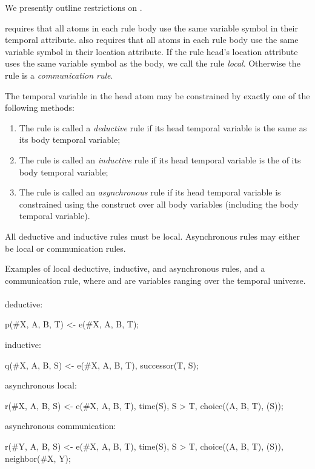 We presently outline restrictions on \lang.

\vspace{1em}
\lang requires that all atoms in each rule body use the same variable symbol in their temporal attribute.  \lang also requires that all atoms in each rule body use the same variable symbol in their location attribute.  If the rule head's location attribute uses the same variable symbol as the body, we call the rule {\em local}.  Otherwise the rule is a {\em communication rule}.

The temporal variable in the head atom may be constrained by exactly one of the following methods:

\begin{enumerate}
\item The rule is called a {\em deductive} rule if its head temporal variable is the same as its body temporal variable;
\item The rule is called an {\em inductive} rule if its head temporal variable is the  of its body temporal variable;
\item The rule is called an {\em asynchronous} rule if its head temporal variable is constrained using the  construct over all body variables (including the body temporal variable).
\end{enumerate}

All deductive and inductive rules must be local.  Asynchronous rules may either be local or communication rules.

\begin{example}
\label{ex:nonsugared}
Examples of local deductive, inductive, and asynchronous rules, and a communication rule, where  and  are variables ranging over the temporal universe.
\\\\
deductive:\\
\begin{Dedalus}
p(#X, A, B, T) <- e(#X, A, B, T);
\end{Dedalus}
inductive:\\
\begin{Dedalus}
q(#X, A, B, S) <- e(#X, A, B, T), successor(T, S);
\end{Dedalus}
asynchronous local:\\
\begin{Dedalus}
r(#X, A, B, S) <- e(#X, A, B, T), time(S), S > T,
                  choice((A, B, T), (S));
\end{Dedalus}
asynchronous communication:\\
\begin{Dedalus}
r(#Y, A, B, S) <- e(#X, A, B, T), time(S), S > T,
                  choice((A, B, T), (S)),
                  neighbor(#X, Y);
\end{Dedalus}
\end{example}

